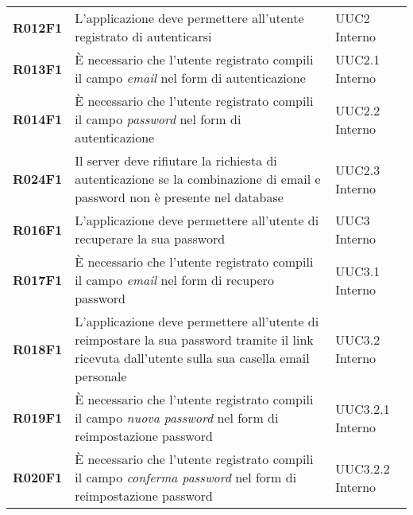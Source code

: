 \documentclass[../analisi-dei-requisiti.tex]{subfiles}
\begin{document}
\begin{longtable}[H]{>{\centering\bfseries}m{3cm} >{\centering}m{10cm} >{\centering\arraybackslash}m{3cm}}
  R012F1                               & L'applicazione deve permettere all'utente registrato di autenticarsi                                                                                                                                    & UUC2 Interno                  \\
  R013F1                               & È necessario che l'utente registrato compili il campo \textit{email} nel form di autenticazione                                                                                                         & UUC2.1 Interno                \\
  R014F1                               & È necessario che l'utente registrato compili il campo \textit{password} nel form di autenticazione                                                                                                      & UUC2.2 Interno                \\
  R024F1                               & Il server deve rifiutare la richiesta di autenticazione se la combinazione di email e password non è presente nel database                                                                              & UUC2.3 Interno                \\
  R016F1                               & L'applicazione deve permettere all'utente di recuperare la sua password                                                                                                                                 & UUC3 Interno                  \\
  R017F1                               & È necessario che l'utente registrato compili il campo \textit{email} nel form di recupero password                                                                                                      & UUC3.1 Interno                \\
  R018F1                               & L'applicazione deve permettere all'utente di reimpostare la sua password tramite il link ricevuta dall'utente sulla sua casella email personale                                                         & UUC3.2 Interno                \\
  R019F1                               & È necessario che l'utente registrato compili il campo \textit{nuova password} nel form di reimpostazione password                                                                                       & UUC3.2.1 Interno              \\
  R020F1                               & È necessario che l'utente registrato compili il campo \textit{conferma password} nel form di reimpostazione password                                                                                    & UUC3.2.2 Interno              \\

\end{longtable}
\end{document}

